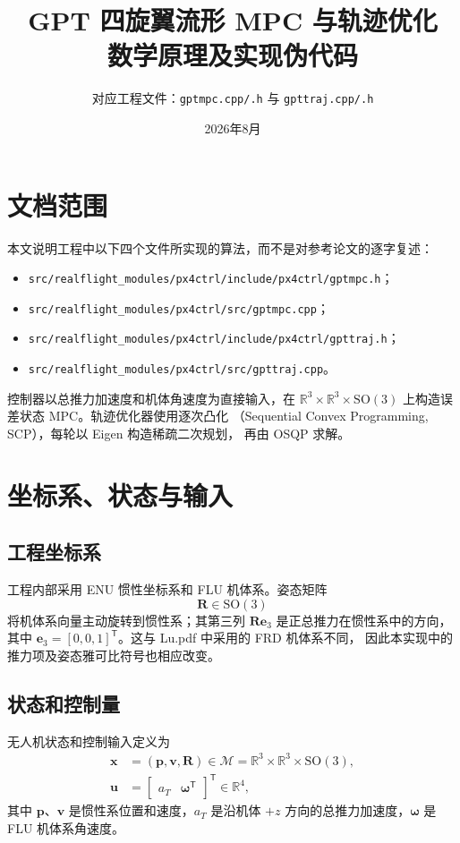 \documentclass[UTF8,a4paper,11pt]{ctexart}
\title{GPT 四旋翼流形 MPC 与轨迹优化\\数学原理及实现伪代码}
\author{对应工程文件：\texttt{gptmpc.cpp/.h} 与 \texttt{gpttraj.cpp/.h}}
\date{2026年8月}
\newcommand{\R}{\mathbb{R}}
\newcommand{\SO}{\mathrm{SO}(3)}
\begin{document}
\maketitle
\tableofcontents

\section{文档范围}

本文说明工程中以下四个文件所实现的算法，而不是对参考论文的逐字复述：
\begin{itemize}
  \item \texttt{src/realflight\_modules/px4ctrl/include/px4ctrl/gptmpc.h}；
  \item \texttt{src/realflight\_modules/px4ctrl/src/gptmpc.cpp}；
  \item \texttt{src/realflight\_modules/px4ctrl/include/px4ctrl/gpttraj.h}；
  \item \texttt{src/realflight\_modules/px4ctrl/src/gpttraj.cpp}。
\end{itemize}

控制器以总推力加速度和机体角速度为直接输入，在
$\R^3\times\R^3\times\SO$ 上构造误差状态 MPC。轨迹优化器使用逐次凸化
（Sequential Convex Programming, SCP），每轮以 Eigen 构造稀疏二次规划，
再由 OSQP 求解。

\section{坐标系、状态与输入}

\subsection{工程坐标系}

工程内部采用 ENU 惯性坐标系和 FLU 机体系。姿态矩阵
\begin{equation}
  \bm R\in\SO
\end{equation}
将机体系向量主动旋转到惯性系；其第三列
$\bm R\bm e_3$ 是正总推力在惯性系中的方向，其中
$\bm e_3=[0,0,1]^\mathsf T$。这与 Lu.pdf 中采用的 FRD 机体系不同，
因此本实现中的推力项及姿态雅可比符号也相应改变。

\subsection{状态和控制量}

无人机状态和控制输入定义为
\begin{align}
  \bm x &= (\bm p,\bm v,\bm R)
  \in \mathcal M=\R^3\times\R^3\times\SO, \\
  \bm u &=
  \begin{bmatrix}a_T&\bm\omega^\mathsf T\end{bmatrix}^{\mathsf T}
  \in\R^4,
\end{align}
其中 $\bm p$、$\bm v$ 是惯性系位置和速度，$a_T$ 是沿机体 $+z$
方向的总推力加速度，$\bm\omega$ 是 FLU 机体系角速度。
\end{document}
